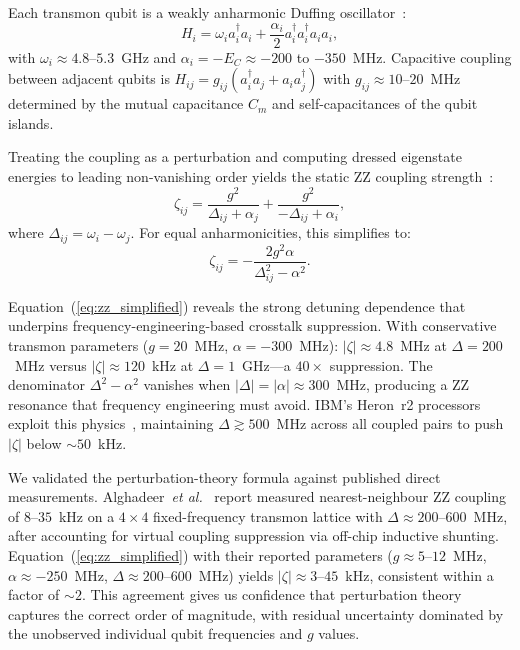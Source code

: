 \documentclass[ASNA,twocolumn]{USG}
\begin{document}
Each transmon qubit is a weakly anharmonic Duffing oscillator~\cite{koch2007transmon,krantz2019guide}:
\begin{equation}
    H_i = \omega_i a_i^\dagger a_i + \frac{\alpha_i}{2} a_i^\dagger a_i^\dagger a_i a_i,
\label{eq:transmon}
\end{equation}
with $\omega_i \approx 4.8$--$5.3$~GHz and $\alpha_i = -E_C \approx -200$ to $-350$~MHz. Capacitive coupling between adjacent qubits is $H_{ij} = g_{ij}(a_i^\dagger a_j + a_i a_j^\dagger)$ with $g_{ij} \approx 10$--$20$~MHz determined by the mutual capacitance $C_m$ and self-capacitances of the qubit islands.

Treating the coupling as a perturbation and computing dressed eigenstate energies to leading non-vanishing order yields the static ZZ coupling strength~\cite{ding2020crosstalk,sarovar2020detecting}:
\begin{equation}
    \zeta_{ij} = \frac{g^2}{\Delta_{ij} + \alpha_j} + \frac{g^2}{-\Delta_{ij} + \alpha_i},
\label{eq:zz_coupling}
\end{equation}
where $\Delta_{ij} = \omega_i - \omega_j$. For equal anharmonicities, this simplifies to:
\begin{equation}
    \zeta_{ij} = -\frac{2g^2\alpha}{\Delta_{ij}^2 - \alpha^2}.
\label{eq:zz_simplified}
\end{equation}

Equation~(\ref{eq:zz_simplified}) reveals the strong detuning dependence that underpins frequency-engineering-based crosstalk suppression. With conservative transmon parameters ($g = 20$~MHz, $\alpha = -300$~MHz): $|\zeta| \approx 4.8$~MHz at $\Delta = 200$~MHz versus $|\zeta| \approx 120$~kHz at $\Delta = 1$~GHz---a $40\times$ suppression. The denominator $\Delta^2 - \alpha^2$ vanishes when $|\Delta| = |\alpha| \approx 300$~MHz, producing a ZZ resonance that frequency engineering must avoid. IBM's Heron~r2 processors exploit this physics~\cite{ibmq2026}, maintaining $\Delta \gtrsim 500$~MHz across all coupled pairs to push $|\zeta|$ below $\sim 50$~kHz.

We validated the perturbation-theory formula against published direct measurements. Alghadeer~\emph{et al.}~\cite{alghadeer2025crosstalk} report measured nearest-neighbour ZZ coupling of $8$--$35$~kHz on a $4\times4$ fixed-frequency transmon lattice with $\Delta \approx 200$--$600$~MHz, after accounting for virtual coupling suppression via off-chip inductive shunting. Equation~(\ref{eq:zz_simplified}) with their reported parameters ($g \approx 5$--$12$~MHz, $\alpha \approx -250$~MHz, $\Delta \approx 200$--$600$~MHz) yields $|\zeta| \approx 3$--$45$~kHz, consistent within a factor of $\sim 2$. This agreement gives us confidence that perturbation theory captures the correct order of magnitude, with residual uncertainty dominated by the unobserved individual qubit frequencies and $g$ values.
\end{document}
